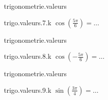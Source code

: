 \begin{qcm}{trigonometrie.valeurs}
    \begin{question}{trigo.valeurs.7.k}
         \({\cos\left(\frac{5\pi}{6}\right)}=\ldots\)
         \vspace{-1.5ex}
         \begin{multicols}{3}
            \begin{reponses}
                \lastchoices
            \end{reponses}
        \end{multicols}
    \end{question}
\end{qcm}

\begin{qcm}{trigonometrie.valeurs}
    \begin{question}{trigo.valeurs.8.k}
         \({\cos\left(-\frac{5\pi}{6}\right)}=\ldots\)
         \vspace{-1.5ex}
         \begin{multicols}{3}
            \begin{reponses}
                \lastchoices
            \end{reponses}
        \end{multicols}
    \end{question}
\end{qcm}

\begin{qcm}{trigonometrie.valeurs}
    \begin{question}{trigo.valeurs.9.k}
         \({\sin\left(\frac{3\pi}{4}\right)}=\ldots\)
         \vspace{-1.5ex}
         \begin{multicols}{3}
            \begin{reponses}
                \lastchoices
            \end{reponses}
        \end{multicols}
    \end{question}
\end{qcm}

